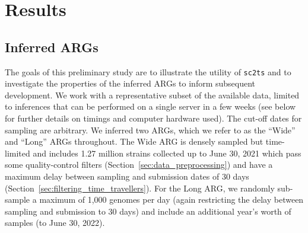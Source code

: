 \documentclass{article}
\begin{document}
\section{Results}
\subsection{Inferred ARGs}
The goals of this preliminary study are to illustrate the utility of
\texttt{sc2ts} and to investigate the properties of the
inferred ARGs to inform subsequent development.
We work with a
representative subset of the available data, limited to
inferences that can be performed on a single server in
a few weeks (see below for further details on timings and
computer hardware used). The cut-off dates for sampling
are arbitrary.
We inferred two ARGs, which we refer to as the
``Wide'' and ``Long'' ARGs throughout.
The Wide ARG is densely sampled but time-limited and
includes 1.27 million strains collected up to June 30, 2021
which
pass some quality-control filters (Section~\ref{sec:data_preprocessing})
and  have a maximum delay between sampling and submission dates of 30 days
(Section~\ref{sec:filtering_time_travellers}).
For the Long ARG, we randomly sub-sample a maximum of 1,000 genomes per
day (again restricting the delay between sampling and submission to 30 days)
and include an additional year's worth of samples (to June 30, 2022).
\end{document}
